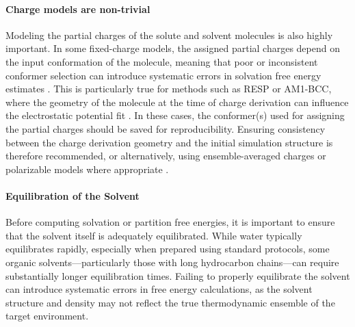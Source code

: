 \documentclass[9pt,bestpractices]{livecoms}
\begin{document}
\paragraph{Charge models are non-trivial}
Modeling the partial charges of the solute and solvent molecules is also highly important. In some fixed-charge models, the assigned partial charges depend on the input conformation of the molecule, meaning that poor or inconsistent conformer selection can introduce systematic errors in solvation free energy estimates \cite{jakalian2000, jambeck2003}. This is particularly true for methods such as RESP\cite{bayly1993resp} or AM1-BCC\cite{jakalian2000}, where the geometry of the molecule at the time of charge derivation can influence the electrostatic potential fit \cite{basma2001, zhang2011, dupradeau2010, osato2025}. In these cases, the conformer(s) used for assigning the partial charges should be saved for reproducibility. Ensuring consistency between the charge derivation geometry and the initial simulation structure is therefore recommended, or alternatively, using ensemble-averaged charges or polarizable models where appropriate \cite{ren2002,lemkul2016}.

\paragraph{Equilibration of the Solvent}
Before computing solvation or partition free energies, it is important to ensure that the solvent itself is adequately equilibrated. While water typically equilibrates rapidly, especially when prepared using standard protocols, some organic solvents—particularly those with long hydrocarbon chains—can require substantially longer equilibration times\cite{fan2021sampl7}. Failing to properly equilibrate the solvent can introduce systematic errors in free energy calculations, as the solvent structure and density may not reflect the true thermodynamic ensemble of the target environment\cite{zhang2017solventmodel}.
\end{document}
